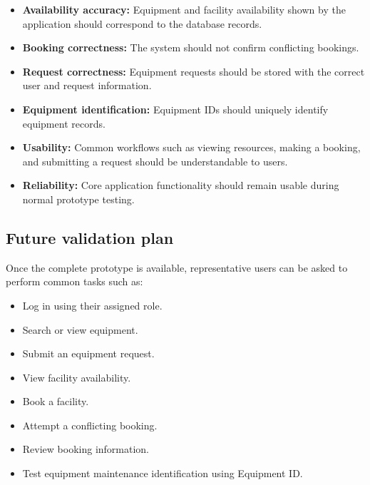\documentclass[11pt,a4paper]{article}
\begin{document}
\begin{itemize}[leftmargin=0.7cm]

    \item \textbf{Availability accuracy:}
    Equipment and facility availability shown by the application should
    correspond to the database records.

    \item \textbf{Booking correctness:}
    The system should not confirm conflicting bookings.

    \item \textbf{Request correctness:}
    Equipment requests should be stored with the correct user and
    request information.

    \item \textbf{Equipment identification:}
    Equipment IDs should uniquely identify equipment records.

    \item \textbf{Usability:}
    Common workflows such as viewing resources, making a booking, and
    submitting a request should be understandable to users.

    \item \textbf{Reliability:}
    Core application functionality should remain usable during normal
    prototype testing.

\end{itemize}

\subsection{Future validation plan}

Once the complete prototype is available, representative users can be
asked to perform common tasks such as:

\begin{itemize}[leftmargin=0.7cm]

    \item Log in using their assigned role.

    \item Search or view equipment.

    \item Submit an equipment request.

    \item View facility availability.

    \item Book a facility.

    \item Attempt a conflicting booking.

    \item Review booking information.

    \item Test equipment maintenance identification using Equipment ID.

\end{itemize}
\end{document}
